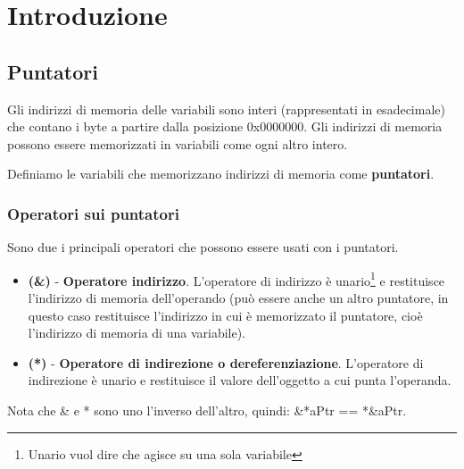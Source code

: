 \newpage
\section{Introduzione}
\subsection{Puntatori}
Gli indirizzi di memoria delle variabili sono interi (rappresentati in esadecimale) che contano i byte a partire dalla posizione 0x0000000. Gli indirizzi di memoria possono essere memorizzati in variabili come ogni altro intero.
\begin{definition}[Puntatori]
Definiamo le variabili che memorizzano indirizzi di memoria come \textbf{puntatori}.
\end{definition}
\subsubsection{Operatori sui puntatori}
Sono due i principali operatori che possono essere usati con i puntatori.
\begin{itemize}
    \item \textbf{(\&)} \hspace{.1cm} - \hspace{.1cm} \textbf{Operatore indirizzo}. L'operatore di indirizzo è unario\footnote{Unario vuol dire che agisce su una sola variabile} e restituisce l'indirizzo di memoria dell'operando (può essere anche un altro puntatore, in questo caso restituisce l'indirizzo in cui è memorizzato il puntatore, cioè l'indirizzo di memoria di una variabile).
    \item \textbf{(*)} \hspace{.1cm} - \hspace{.1cm} \textbf{Operatore di indirezione o dereferenziazione}. L'operatore di indirezione è unario e restituisce il valore dell'oggetto a cui punta l'operanda. 
\end{itemize}

\begin{note}
Nota che \& e * sono uno l'inverso dell'altro, quindi: \&*aPtr == *\&aPtr.
\end{note}

